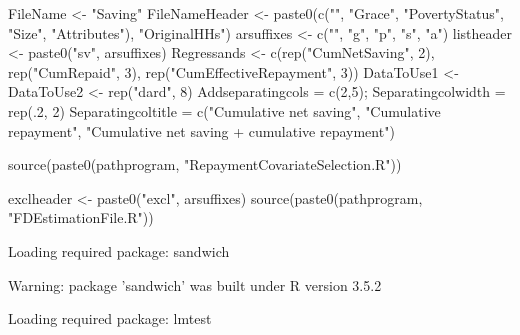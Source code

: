 \begin{Schunk}
\begin{Sinput}
FileName <- "Saving"
FileNameHeader <- paste0(c("", "Grace", "PovertyStatus", "Size", "Attributes"),
  "OriginalHHs")
arsuffixes <- c("", "g", "p", "s", "a")
listheader <- paste0("sv", arsuffixes)
Regressands <-  c(rep("CumNetSaving", 2), rep("CumRepaid", 3), 
  rep("CumEffectiveRepayment", 3))
DataToUse1 <- DataToUse2 <- rep("dard", 8)
Addseparatingcols = c(2,5); Separatingcolwidth = rep(.2, 2)
Separatingcoltitle = c("Cumulative net saving", "Cumulative repayment", 
   "Cumulative net saving + cumulative repayment")
\end{Sinput}
\end{Schunk}
\begin{Schunk}
\begin{Sinput}
source(paste0(pathprogram, "RepaymentCovariateSelection.R"))
\end{Sinput}
\end{Schunk}
\begin{Schunk}
\begin{Sinput}
exclheader <- paste0("excl", arsuffixes)
source(paste0(pathprogram, "FDEstimationFile.R"))
\end{Sinput}
\begin{Soutput}
Loading required package: sandwich
\end{Soutput}
\begin{Soutput}
Warning: package 'sandwich' was built under R version 3.5.2
\end{Soutput}
\begin{Soutput}
Loading required package: lmtest
\end{Soutput}
\end{Schunk}

